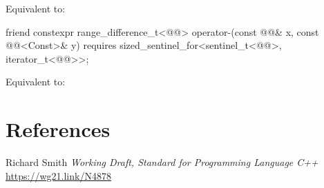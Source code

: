 \documentclass{wg21}
\begin{document}
\begin{addedblock}
\begin{itemdescr}
    \pnum
    \effects
    Equivalent to: 
\end{itemdescr}

\begin{itemdecl}
    friend constexpr range_difference_t<@@>
    operator-(const @@& x, const @@<Const>& y)
    requires sized_sentinel_for<sentinel_t<@@>, iterator_t<@@>>;
\end{itemdecl}

\begin{itemdescr}
    \pnum
    \effects
    Equivalent to: 
\end{itemdescr}

\end{addedblock}


\section{References}
\renewcommand{\section}[2]{}%



\begin{thebibliography}{9}

    Richard Smith
    \emph{Working Draft, Standard for Programming Language C++}\newline
    \url{https://wg21.link/N4878}

\end{thebibliography}
\end{document}
